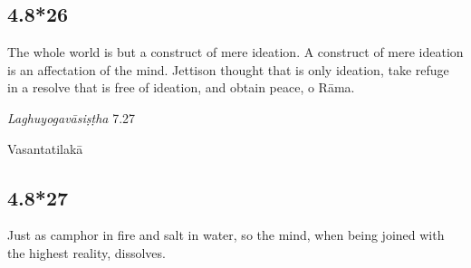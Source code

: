 \begin{ekdosis}

\subsection*{4.8*26}
\begin{translation}[hp04_008_26]
The whole world is but a construct of mere ideation. A construct of mere ideation is an affectation of the mind. Jettison thought that is only ideation, take refuge in a resolve that is free of ideation, and obtain peace, o Rāma.
\end{translation}

\begin{sources}[hp04_008_26]
\emph{Laghuyogavāsiṣṭha} 7.27
\begin{versinnote}
\end{versinnote}
\end{sources}



\begin{metre}[hp04_008_26]
Vasantatilakā
\end{metre}

\subsection*{4.8*27}
\begin{translation}[hp04_008_27]
Just as camphor in fire and salt in water, so the mind, when being joined with the highest reality, dissolves.
\end{translation}



\end{ekdosis}
